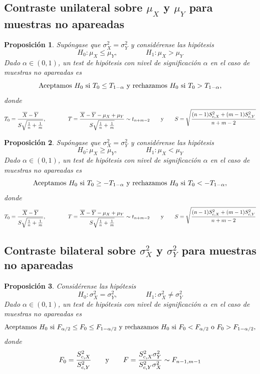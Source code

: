 \documentclass[11pt]{report}
\newtheorem{proposition}{Proposición}
\theoremstyle{definition}
\begin{document}
\subsection{Contraste unilateral sobre \texorpdfstring{$\mu_X$}{TEXT} y \texorpdfstring{$\mu_Y$}{TEXT} para muestras no apareadas}


\begin{proposition}
    Supóngase que $\sigma^2_X = \sigma^2_Y$ y considérense las hipótesis
    \[H_0 \colon \mu_X \leq \mu_Y, \qquad \qquad H_1 \colon \mu_X> \mu_Y\]
    Dado $\alpha \in (0,1)$, un test de hipótesis con nivel de significación $\alpha$ en el caso de muestras no apareadas es
    \[\textup{{Aceptamos} } H_0 \textup{ {si} } T_0 \leq T_{1-\alpha} \textup{ {y rechazamos} } H_0 \textup{ {si} } T_0 > T_{1-\alpha},\]
    donde
    \[T_0= \frac{\overline{X}-\overline{Y}}{S\sqrt{\frac{1}{n}+\frac{1}{m}}}, \qquad \qquad T = \frac{\overline{X}-\overline{Y}-\mu_X+\mu_Y}{S\sqrt{\frac{1}{n}+\frac{1}{m}}} \sim t_{n+m-2} \qquad \textup{y} \qquad S = \sqrt{\frac{(n-1)S^2_{c,X}+(m-1)S^2_{c,Y}}{n+m-2}}\]
\end{proposition}

\begin{proposition}
    Supóngase que $\sigma^2_X = \sigma^2_Y$ y considérense las hipótesis
    \[H_0 \colon \mu_X \geq \mu_Y, \qquad \qquad H_1 \colon \mu_X< \mu_Y\]
    Dado $\alpha \in (0,1)$, un test de hipótesis con nivel de significación $\alpha$ en el caso de muestras no apareadas es
    \[\textup{{Aceptamos} } H_0 \textup{ {si} } T_0 \geq -T_{1-\alpha} \textup{ {y rechazamos} } H_0 \textup{ {si} } T_0 < -T_{1-\alpha},\]
    donde
    \[T_0= \frac{\overline{X}-\overline{Y}}{S\sqrt{\frac{1}{n}+\frac{1}{m}}}, \qquad \qquad T = \frac{\overline{X}-\overline{Y}-\mu_X+\mu_Y}{S\sqrt{\frac{1}{n}+\frac{1}{m}}} \sim t_{n+m-2} \qquad \textup{y} \qquad S = \sqrt{\frac{(n-1)S^2_{c,X}+(m-1)S^2_{c,Y}}{n+m-2}}\]
\end{proposition}

\subsection{Contraste bilateral sobre \texorpdfstring{$\sigma^2_X$}{TEXT} y \texorpdfstring{$\sigma^2_Y$}{TEXT} para muestras no apareadas}

\begin{proposition}
    Considérense las hipótesis
    \[H_0 \colon \sigma_X^2=\sigma_Y^2, \qquad \qquad H_1 \colon \sigma_X^2\neq\sigma_Y^2\]
    Dado $\alpha \in (0,1)$, un test de hipótesis con nivel de significación $\alpha$ en el caso de muestras no apareadas es
    \[\textup{{Aceptamos} } H_0 \textup{ {si} } F_{\alpha/2} \leq F_0 \leq F_{1-\alpha/2} \textup{ {y rechazamos} } H_0 \textup{ {si} } F_0 < F_{\alpha/2} \textup{ o } F_0 > F_{1-\alpha/2},\]
    donde
    \[F_0= \frac{S^2_{c,X}}{S^2_{c,Y}} \qquad \textup{y} \qquad F = \frac{S^2_{c,X}\sigma^2_Y}{S^2_{c,Y}\sigma^2_X} \sim F_{n-1,m-1}\]
\end{proposition}
\end{document}
